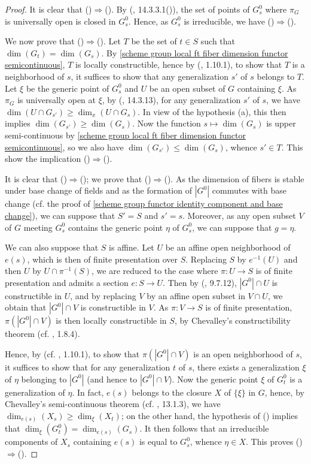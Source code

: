 \begin{proof}
It is clear that ()$\Rightarrow$(). By (\cite{EGA4-3}, 14.3.3.1()), the set of points of $G^0_s$ where $\pi_G$ is universally open is closed in $G^0_s$. Hence, as $G^0_s$ is irreducible, we have ()$\Rightarrow$().\par
We now prove that ()$\Rightarrow$(). Let $T$ be the set of $t\in S$ such that $\dim(G_t)=\dim(G_s)$. By \cref{scheme group local ft fiber dimension functor semicontinuous}, $T$ is locally constructible, hence by (\cite{EGA4-1}, 1.10.1), to show that $T$ is a neighborhood of $s$, it suffices to show that any generalization $s'$ of $s$ belongs to $T$. Let $\xi$ be the generic point of $G^0_s$ and $U$ be an open subset of $G$ containing $\xi$. As $\pi_G$ is universally open at $\xi$, by (\cite{EGA4-3}, 14.3.13), for any generalization $s'$ of $s$, we have $\dim(U\cap G_{s'})\geq\dim_x(U\cap G_s)$. In view of the hypothesis (a), this then implies $\dim(G_{s'})\geq\dim(G_s)$. Now the function $s\mapsto\dim(G_s)$ is upper semi-continuous by \cref{scheme group local ft fiber dimension functor semicontinuous}, so we also have $\dim(G_{s'})\leq\dim(G_s)$, whence $s'\in T$. This show the implication ()$\Rightarrow$().\par
It is clear that ()$\Rightarrow$(); we prove that ()$\Rightarrow$(). As the dimension of fibers is stable under base change of fields and as the formation of $|G^0|$ commutes with base change (cf. the proof of \cref{scheme group functor identity component and base change}), we can suppose that $S'=S$ and $s'=s$. Moreover, as any open subset $V$ of $G$ meeting $G^0_s$ contains the generic point $\eta$ of $G^0_s$, we can suppose that $g=\eta$.\par
We can also suppose that $S$ is affine. Let $U$ be an affine open neighborhood of $e(s)$, which is then of finite presentation over $S$. Replacing $S$ by $e^{-1}(U)$ and then $U$ by $U\cap\pi^{-1}(S)$, we are reduced to the case where $\pi:U\to S$ is of finite presentation and admits a section $e:S\to U$. Then by (\cite{EGA4-3}, 9.7.12), $|G^0|\cap U$ is constructible in $U$, and by replacing $V$ by an affine open subset in $V\cap U$, we obtain that $|G^0|\cap V$ is constructible in $V$. As $\pi:V\to S$ is of finite presentation, $\pi(|G^0|\cap V)$ is then locally constructible in $S$, by Chevalley's constructibility theorem (cf. \cite{EGA4-1}, 1.8.4).\par
Hence, by (cf. \cite{EGA4-1}, 1.10.1), to show that $\pi(|G^0|\cap V)$ is an open neighborhood of $s$, it suffices to show that for any generalization $t$ of $s$, there exists a generalization $\xi$ of $\eta$ belonging to $|G^0|$ (and hence to $|G^0|\cap V$). Now the generic point $\xi$ of $G_t^0$ is a generalization of $\eta$. In fact, $e(s)$ belongs to the closure $X$ of $\{\xi\}$ in $G$, hence, by Chevalley's semi-continuous theorem (cf. \cite{EGA4-3}, 13.1.3), we have $\dim_{e(s)}(X_s)\geq\dim_\xi(X_t)$; on the other hand, the hypothesis of () implies that $\dim_\xi(G_t^0)=\dim_{e(s)}(G_s)$. It then follows that an irreducible components of $X_s$ containing $e(s)$ is equal to $G_s^0$, whence $\eta\in X$. This proves ()$\Rightarrow$().

\end{proof}
